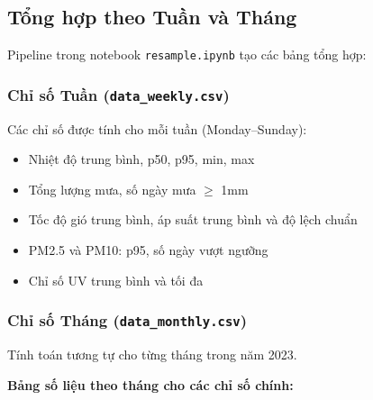 \documentclass[12pt,a4paper]{article}
\begin{document}
\subsection{Tổng hợp theo Tuần và Tháng}

Pipeline trong notebook \texttt{resample.ipynb} tạo các bảng tổng hợp:

\subsubsection{Chỉ số Tuần (\texttt{data\_weekly.csv})}
Các chỉ số được tính cho mỗi tuần (Monday--Sunday):
\begin{itemize}
    \item Nhiệt độ trung bình, p50, p95, min, max
    \item Tổng lượng mưa, số ngày mưa $\geq$ 1mm
    \item Tốc độ gió trung bình, áp suất trung bình và độ lệch chuẩn
    \item PM2.5 và PM10: p95, số ngày vượt ngưỡng
    \item Chỉ số UV trung bình và tối đa
\end{itemize}

\subsubsection{Chỉ số Tháng (\texttt{data\_monthly.csv})}
Tính toán tương tự cho từng tháng trong năm 2023.

\textbf{Bảng số liệu theo tháng cho các chỉ số chính:}
\end{document}
